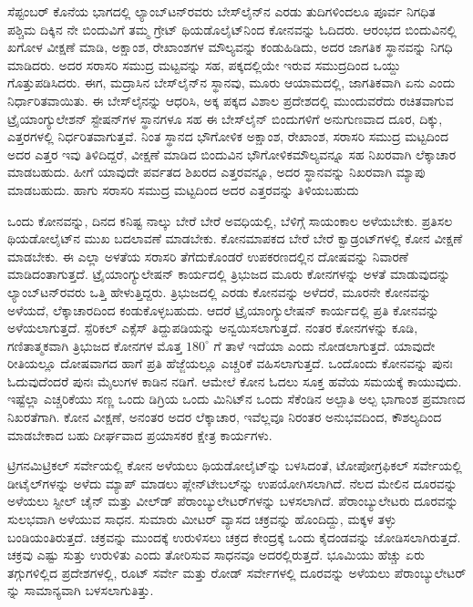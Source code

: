 ಸೆಪ್ಟಂಬರ್​ ಕೊನೆಯ ಭಾಗದಲ್ಲಿ ಲ್ಯಾಂಬ್​ಟನ್​ರವರು ಬೇಸ್‌ಲೈನ್​ನ ಎರಡು ತುದಿಗಳಿಂದಲೂ ಪೂರ್ವ ನಿಗಧಿತ ಪಶ್ಚಿಮ ದಿಕ್ಕಿನ ನೇ ಬಿಂದುವಿಗೆ ತಮ್ಮ ಗ್ರೇಟ್​ ಥಿಯಡೊಲೈಟ್​\break ನಿಂದ ಕೋನವನ್ನು ಓದಿದರು. ಆರಂಭದ ಬಿಂದುವಿನಲ್ಲಿ ಖಗೋಳ ವೀಕ್ಷಣೆ ಮಾಡಿ, ಅಕ್ಷಾಂಶ, ರೇಖಾಂಶಗಳ ಮೌಲ್ಯವನ್ನು ಕಂಡುಹಿಡಿದು, ಅದರ ಜಾಗತಿಕ ಸ್ಥಾನವನ್ನು ನಿಗಧಿ ಮಾಡಿದರು. ಅದರ ಸರಾಸರಿ ಸಮುದ್ರ ಮಟ್ಟವನ್ನು ಸಹ, ಪಕ್ಕದಲ್ಲಿಯೇ ಇರುವ ಸಮುದ್ರದಿಂದ ಒಯ್ದು ಗೊತ್ತುಪಡಿಸಿದರು. ಈಗ, ಮದ್ರಾಸಿನ ಬೇಸ್‌ಲೈನ್​ನ ಸ್ಥಾನವು, ಮೂರು ಆಯಾಮದಲ್ಲಿ, ಜಾಗತಿಕವಾಗಿ ಏನು ಎಂದು ನಿರ್ಧಾರಿತವಾಯಿತು. ಈ ಬೇಸ್‌ಲೈನನ್ನು ಆಧರಿಸಿ, ಅಕ್ಕ ಪಕ್ಕದ ವಿಶಾಲ ಪ್ರದೇಶದಲ್ಲಿ ಮುಂದುವರೆದು ರಚಿತವಾಗುವ ಟ್ರೈಯಾಂಗ್ಯುಲೇಶನ್​ ಸ್ಟೇಷನ್​ಗಳ ಸ್ಥಾನಗಳೂ ಸಹ ಈ ಬೇಸ್‌ಲೈನ್​ ಬಿಂದುಗಳಿಗೆ ಅನುಗುಣವಾದ ದೂರ, ದಿಕ್ಕು, ಎತ್ತರಗಳಲ್ಲಿ ನಿರ್ಧರಿತವಾಗುತ್ತವೆ. ನಿಂತ ಸ್ಥಾನದ ಭೌಗೋಳಿಕ ಅಕ್ಷಾಂಶ, ರೇಖಾಂಶ, ಸರಾಸರಿ ಸಮುದ್ರ ಮಟ್ಟದಿಂದ ಅದರ ಎತ್ತರ ಇವು ತಿಳಿದಿದ್ದರೆ, ವೀಕ್ಷಣೆ ಮಾಡಿದ ಬಿಂದುವಿನ ಭೌಗೋಳಿಕ\break ಮೌಲ್ಯವನ್ನೂ ಸಹ ನಿಖರವಾಗಿ ಲೆಕ್ಕಾಚಾರ ಮಾಡಬಹುದು. ಹೀಗೆ ಯಾವುದೇ ಪರ್ವತದ ಶಿಖರದ ಎತ್ತರವನ್ನೂ, ಅದರ ಸ್ಥಾನವನ್ನು ನಿಖರವಾಗಿ ಮ್ಯಾಪು ಮಾಡಬಹುದು. ಹಾಗು ಸರಾಸರಿ ಸಮುದ್ರ ಮಟ್ಟದಿಂದ ಅದರ ಎತ್ತರವನ್ನು ತಿಳಿಯಬಹುದು

ಒಂದು ಕೋನವನ್ನು, ದಿನದ ಕನಿಷ್ಟ ನಾಲ್ಕು ಬೇರೆ ಬೇರೆ ಅವಧಿಯಲ್ಲಿ, ಬೆಳಿಗ್ಗೆ ಸಾಯಂಕಾಲ ಅಳೆಯಬೇಕು. ಪ್ರತಿಸಲ ಥಿಯಡೋಲೈಟ್​ನ ಮುಖ ಬದಲಾವಣೆ ಮಾಡಬೇಕು. ಕೋನಮಾಪಕದ ಬೇರೆ ಬೇರೆ ಕ್ವಾಡ್ರಂಟ್​ಗಳಲ್ಲಿ ಕೋನ ವೀಕ್ಷಣೆ ಮಾಡಬೇಕು. ಈ ಎಲ್ಲಾ ಅಳತೆಯ ಸರಾಸರಿ ತೆಗೆದುಕೊಂಡರೆ ಉಪಕರಣದಲ್ಲಿನ ದೋಷವನ್ನು ನಿವಾರಣೆ ಮಾಡಿದಂತಾಗುತ್ತದೆ. ಟ್ರೈಯಾಂಗ್ಯುಲೇಷನ್​ ಕಾರ್ಯದಲ್ಲಿ ತ್ರಿಭುಜದ ಮೂರು ಕೋನಗಳನ್ನು ಅಳತೆ ಮಾಡುವುದನ್ನು ಲ್ಯಾಂಬ್​ಟನ್​ರವರು ಒತ್ತಿ ಹೇಳುತ್ತಿದ್ದರು. ತ್ರಿಭುಜದಲ್ಲಿ ಎರಡು ಕೋನವನ್ನು ಅಳೆದರೆ, ಮೂರನೇ ಕೋನವನ್ನು ಅಳೆಯದೆ, ಲೆಕ್ಕಾಚಾರದಿಂದ ಕಂಡುಕೊಳ್ಳಬಹುದು. ಆದರೆ ಟ್ರೈಯಾಂಗ್ಯುಲೇಷನ್​ ಕಾರ್ಯದಲ್ಲಿ ಪ್ರತಿ ಕೋನವನ್ನು ಅಳೆಯಲಾಗುತ್ತದೆ. ಸ್ಪೆರಿಕಲ್​ ಎಕ್ಸೆಸ್​ ತಿದ್ದುಪಡಿಯನ್ನು ಅನ್ವಯಿಸಲಾಗುತ್ತದೆ. ನಂತರ  ಕೋನಗಳನ್ನು ಕೂಡಿ, ಗಣಿತಾತ್ಮಕವಾಗಿ ತ್ರಿಭುಜದ  ಕೋನಗಳ ಮೊತ್ತ $180^\circ$ ಗೆ ತಾಳೆ ಇದೆಯಾ ಎಂದು ನೋಡಲಾಗುತ್ತದೆ. ಯಾವುದೇ ರೀತಿಯಲ್ಲೂ ದೋಷವಾಗದ ಹಾಗೆ ಪ್ರತಿ ಹೆಜ್ಜೆಯಲ್ಲೂ ಎಚ್ಚರಿಕೆ ವಹಿಸಲಾಗುತ್ತದೆ. ಒಂದೊಂದು ಕೋನವನ್ನು ಪುನಃ ಓದುವುದೆಂದರೆ ಪುನಃ  ಮೈಲುಗಳ ಕಾಡಿನ ನಡಿಗೆ. ಆಮೇಲೆ ಕೋನ ಓದಲು ಸೂಕ್ತ ಹವೆಯ ಸಮಯಕ್ಕೆ ಕಾಯುವುದು. ಇಷ್ಟೆಲ್ಲಾ ಎಚ್ಚರಿಕೆಯು ಸಣ್ಣ ಒಂದು ಡಿಗ್ರಿಯ ಒಂದು ಮಿನಿಟ್​ನ ಒಂದು ಸೆಕೆಂಡಿನ ಅಲ್ಪಾತಿ ಅಲ್ಪ ಭಾಗಾಂಶ ಪ್ರಮಾಣದ ನಿಖರತೆಗಾಗಿ. ಕೋನ ವೀಕ್ಷಣೆ, ಅನಂತರ ಅದರ ಲೆಕ್ಕಾಚಾರ, ಇವೆಲ್ಲವೂ ನಿರಂತರ ಅನುಭವದಿಂದ, ಕೌಶಲ್ಯದಿಂದ ಮಾಡಬೇಕಾದ ಬಹು ದೀರ್ಘವಾದ ಪ್ರಯಾಸಕರ ಕ್ಷೇತ್ರ ಕಾರ್ಯಗಳು.

ಟ್ರಿಗನಮಿಟ್ರಿಕಲ್​ ಸರ್ವೇಯಲ್ಲಿ ಕೋನ ಅಳೆಯಲು ಥಿಯಡೋಲೈಟ್​ನ್ನು ಬಳಸಿದಂತೆ, ಟೋಪೋಗ್ರಫಿಕಲ್​ ಸರ್ವೇಯಲ್ಲಿ ಡೀಟೈಲ್​ಗಳನ್ನು ಅಳೆದು ಮ್ಯಾಪ್​ ಮಾಡಲು ಪ್ಲೇನ್​\break ಟೇಬಲ್​ನ್ನು ಉಪಯೋಗಿಸಲಾಗಿದೆ. ನೆಲದ ಮೇಲಿನ ದೂರವನ್ನು ಅಳೆಯಲು ಸ್ಟೀಲ್​ ಚೈನ್​ ಮತ್ತು ವೀಲ್​ಡ್​ ಪೆರಾಂಬ್ಯುಲೇಟರ್​ಗಳನ್ನು ಬಳಸಲಾಗಿದೆ. ಪೆರಾಂಬ್ಯುಲೇಟರು ದೂರವನ್ನು ಸುಲಭವಾಗಿ ಅಳೆಯುವ ಸಾಧನ. ಸುಮಾರು  ಮೀಟರ್​ ವ್ಯಾಸದ ಚಕ್ರವನ್ನು ಹೊಂದಿದ್ದು, ಮಕ್ಕಳ ತಳ್ಳು ಬಂಡಿಯಂತಿರುತ್ತದೆ. ಚಕ್ರವನ್ನು ಮುಂದಕ್ಕೆ ಉರುಳಿಸಲು ಚಕ್ರದ ಕೇಂದ್ರಕ್ಕೆ ಒಂದು ಕೈದಂಡವನ್ನು ಜೋಡಿಸಲಾಗಿರುತ್ತದೆ. ಚಕ್ರವು ಎಷ್ಟು ಸುತ್ತು ಉರುಳಿತು ಎಂದು ತೋರಿಸುವ ಸಾಧನವೂ ಅದರಲ್ಲಿರುತ್ತದೆ. ಭೂಮಿಯು ಹೆಚ್ಚು ಏರು ತಗ್ಗುಗಳಿಲ್ಲಿದ ಪ್ರದೇಶಗಳಲ್ಲಿ, ರೂಟ್​ ಸರ್ವೇ ಮತ್ತು ರೋಡ್​ ಸರ್ವೇಗಳಲ್ಲಿ ದೂರವನ್ನು ಅಳೆಯಲು ಪೆರಾಂಬ್ಯುಲೇಟರ್​ನ್ನು ಸಾಮಾನ್ಯವಾಗಿ ಬಳಸಲಾಗುತಿತ್ತು.

